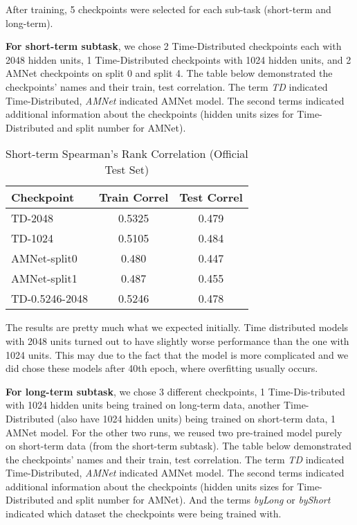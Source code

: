 After training, 5 checkpoints were selected for each sub-task (short-term and long-term).

\textbf{For short-term subtask}, we chose 2 Time-Distributed checkpoints each with 2048 hidden units, 1 Time-Distributed checkpoints with 1024 hidden units, and 2 AMNet checkpoints on split 0 and split 4. The table below demonstrated the checkpoints' names and their train, test correlation. The term \emph{TD} indicated Time-Distributed, \emph{AMNet} indicated AMNet model. The second terms indicated additional information about the checkpoints (hidden units sizes for Time-Distributed and split number for AMNet).

\begin{table}[h]
\begin{center}
\begin{tabular}{@{}lcc@{}}
Checkpoint & Train Correl & Test Correl \\ \midrule
TD-2048 & 0.5325 & 0.479 \\
TD-1024 & 0.5105 & 0.484 \\
AMNet-split0 & 0.480 & 0.447 \\
AMNet-split1 & 0.487 & 0.455 \\
TD-0.5246-2048 & 0.5246 & 0.478
\end{tabular}
\caption{Short-term Spearman's Rank Correlation (Official Test Set)}
\end{center}
\end{table}

The results are pretty much what we expected initially. Time distributed models with 2048 units turned out to have slightly worse performance than the one with 1024 units. This may due to the fact that the model is more complicated and we did chose these models after 40th epoch, where overfitting usually occurs.

\textbf{For long-term subtask}, we chose 3 different checkpoints, 1 Time-Dis-tributed with 1024 hidden units being trained on long-term data, another Time-Distributed (also have 1024 hidden units) being trained on short-term data, 1 AMNet model. For the other two runs, we reused two pre-trained model purely on short-term data (from the short-term subtask). The table below demonstrated the checkpoints' names and their train, test correlation. The term \emph{TD} indicated Time-Distributed, \emph{AMNet} indicated AMNet model. The second terms indicated additional information about the checkpoints (hidden units sizes for Time-Distributed and split number for AMNet). And the terms \emph{byLong} or \emph{byShort} indicated which dataset the checkpoints were being trained with.

